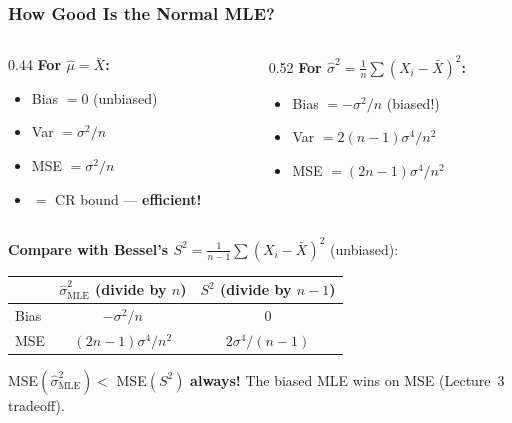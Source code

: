 \documentclass[aspectratio=169]{beamer}
\begin{document}
\begin{frame}
\frametitle{How Good Is the Normal MLE?}

\small
\begin{columns}[T]
\begin{column}{0.44\textwidth}
\textbf{For $\hat\mu = \bar{X}$:}
\begin{itemize}\setlength{\itemsep}{1pt}
  \item Bias $= 0$ \quad (unbiased)
  \item Var $= \sigma^2/n$
  \item MSE $= \sigma^2/n$
  \item[\textcolor{paramgreen}{\checkmark}] \textcolor{paramgreen}{$=$ CR bound --- \textbf{efficient!}}
\end{itemize}
\end{column}
\begin{column}{0.52\textwidth}
\textbf{For $\hat\sigma^2 = \frac{1}{n}\sum(X_i - \bar{X})^2$:}
\begin{itemize}\setlength{\itemsep}{1pt}
  \item Bias $= -\sigma^2/n$ \quad \textcolor{warnred}{(biased!)}
  \item Var $= 2(n{-}1)\sigma^4/n^2$
  \item MSE $= (2n{-}1)\sigma^4/n^2$
\end{itemize}
\end{column}
\end{columns}

\pause
\vspace{0.25cm}
\textbf{Compare with Bessel's $S^2 = \frac{1}{n-1}\sum(X_i - \bar{X})^2$} (unbiased):

\vspace{0.1cm}
\begin{center}\small
\renewcommand{\arraystretch}{1.3}
\begin{tabular}{@{}lcc@{}}
  & $\hat\sigma^2_{\text{MLE}}$ \;(divide by $n$) & $S^2$ \;(divide by $n{-}1$) \\
  \hline
  Bias & $-\sigma^2/n$ & $0$ \\
  MSE & $(2n{-}1)\sigma^4/n^2$ & $2\sigma^4/(n{-}1)$ \\
  \hline
\end{tabular}
\end{center}

\vspace{0.1cm}
\centering MSE$(\hat\sigma^2_{\text{MLE}}) <$ MSE$(S^2)$ \textbf{always!} \;The biased MLE wins on MSE (Lecture~3 tradeoff).
\end{frame}
\end{document}
